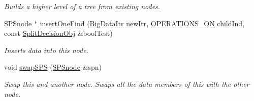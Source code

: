 \begin{DoxyCompactItemize}
\begin{DoxyCompactList}\small\item\em \-Builds a higher level of a tree from existing nodes. \end{DoxyCompactList}\item 
\hyperlink{classsubpavings_1_1SPSnode}{\-S\-P\-Snode} $\ast$ \hyperlink{classsubpavings_1_1SPSnode_af0d351af2a515188522e13e0c6502a18}{insert\-One\-Find} (\hyperlink{namespacesubpavings_a8792314c11b28ac2b8c4c85c47526f3a}{\-Big\-Data\-Itr} new\-Itr, \hyperlink{namespacesubpavings_ae1ea349cda4812634df03761ebfc1c98}{\-O\-P\-E\-R\-A\-T\-I\-O\-N\-S\-\_\-\-O\-N} child\-Ind, const \hyperlink{classsubpavings_1_1SplitDecisionObj}{\-Split\-Decision\-Obj} \&bool\-Test)
\begin{DoxyCompactList}\small\item\em \-Inserts data into this node. \end{DoxyCompactList}\item 
void \hyperlink{classsubpavings_1_1SPSnode_a8ce80cd650645f34e79fbc1d4beb2326}{swap\-S\-P\-S} (\hyperlink{classsubpavings_1_1SPSnode}{\-S\-P\-Snode} \&spn)
\begin{DoxyCompactList}\small\item\em \-Swap this and another node. \-Swaps all the data members of this with the other node. \end{DoxyCompactList}\end{DoxyCompactItemize}
